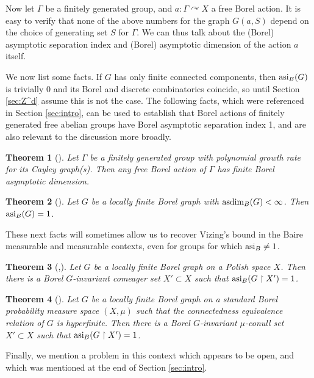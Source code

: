 \documentclass[10pt,a4paper]{article}
\newcommand{\0}{\varnothing}
\newcommand{\asdim}{\textnormal{asdim}}
\newcommand{\asi}{\textnormal{asi}}
\newcommand{\res}{\upharpoonright}
\newtheorem{theorem}{Theorem}
\begin{document}
 Now let $\Gamma$ be a finitely generated group, and $a:\Gamma \curvearrowright X$ a free Borel action. It is easy to verify that none of the above numbers for the graph $G(a,S)$ depend on the choice of generating set $S$ for $\Gamma$. We can thus talk about the (Borel) asymptotic separation index and (Borel) asymptotic dimension of the action $a$ itself.
 
 We now list some facts. If $G$ has only finite connected components, then $\asi_B(G)$ is trivially 0 and its Borel and discrete combinatorics coincide, so until Section \ref{sec:Z^d} assume this is not the case. The following facts, which were referenced in Section \ref{sec:intro}, can be used to establish that Borel actions of finitely generated free abelian groups have Borel asymptotic separation index 1, and are also relevant to the discussion more broadly.
 
 \begin{theorem}[\cite{dim}]\label{th:poly}
 Let $\Gamma$ be a finitely generated group with polynomial growth rate for its Cayley graph(s). Then any free Borel action of $\Gamma$ has finite Borel asymptotic dimension. 
 \end{theorem}
 
 \begin{theorem}[\cite{dim}]\label{th:asi=1}
 Let $G$ be a locally finite Borel graph with $\asdim_B(G) < \infty$. Then $\asi_B(G) = 1$.
 \end{theorem}
 
 These next facts will sometimes allow us to recover Vizing's bound in the Baire measurable and measurable contexts, even for groups for which $\asi_B \neq 1$.
 
\begin{theorem}[\cite{CM},\cite{dim}]\label{th:category}
Let $G$ be a locally finite Borel graph on a Polish space $X$. Then there is a Borel $G$-invariant comeager set $X' \subset X$ such that $\asi_B(G \res X') = 1$.
\end{theorem}

\begin{theorem}[\cite{CM}]\label{th:measure}
Let $G$ be a locally finite Borel graph on a standard Borel probability measure space $(X,\mu)$ such that the connectedness equivalence relation of $G$ is hyperfinite. Then there is a Borel $G$-invariant $\mu$-conull set $X' \subset X$ such that $\asi_B(G \res X') = 1$.
\end{theorem}
 
Finally, we mention a problem in this context which appears to be open, and which was mentioned at the end of Section \ref{sec:intro}.
\end{document}
